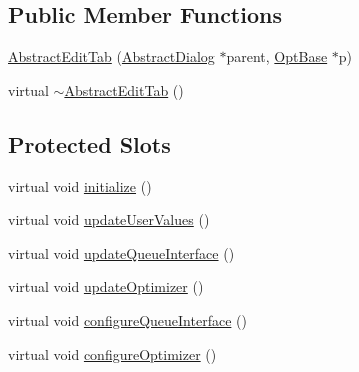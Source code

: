 \subsection*{Public Member Functions}
\begin{DoxyCompactItemize}
\item 
\hyperlink{classGlobalSearch_1_1AbstractEditTab_a7c6f355f4e1ee393bb2dd93425e6f02a}{Abstract\+Edit\+Tab} (\hyperlink{classGlobalSearch_1_1AbstractDialog}{Abstract\+Dialog} $\ast$parent, \hyperlink{classGlobalSearch_1_1OptBase}{Opt\+Base} $\ast$p)
\item 
virtual \hyperlink{classGlobalSearch_1_1AbstractEditTab_ab4d202689e2018ad8db8b23a485d091d}{$\sim$\+Abstract\+Edit\+Tab} ()
\end{DoxyCompactItemize}
\subsection*{Protected Slots}
\begin{DoxyCompactItemize}
\item 
virtual void \hyperlink{classGlobalSearch_1_1AbstractEditTab_afb9fd8fbcf71d7287a8117ce4d75a00b}{initialize} ()
\item 
virtual void \hyperlink{classGlobalSearch_1_1AbstractEditTab_a3c241c0807a7f1dff4e75a7d9f2354fc}{update\+User\+Values} ()
\item 
virtual void \hyperlink{classGlobalSearch_1_1AbstractEditTab_aec415636f7b9aa295f8ae6d9a9035184}{update\+Queue\+Interface} ()
\item 
virtual void \hyperlink{classGlobalSearch_1_1AbstractEditTab_ad92c42eafb4b2bf681f3032148083441}{update\+Optimizer} ()
\item 
virtual void \hyperlink{classGlobalSearch_1_1AbstractEditTab_a4bd14eb377b74813bfc1474b92432567}{configure\+Queue\+Interface} ()
\item 
virtual void \hyperlink{classGlobalSearch_1_1AbstractEditTab_a4cc539eb78a2bcb984e46f73cbe2dfcd}{configure\+Optimizer} ()
\end{DoxyCompactItemize}
